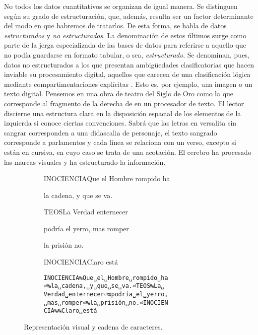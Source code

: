 No todos los datos cuantitativos se organizan de igual manera. Se distinguen según su grado de estructuración, que, además, resulta ser un factor determinante del modo en que habremos de tratarlos. De esta forma, se habla de datos \textit{estructurados} y \textit{no estructurados}. La denominación de estos últimos surge como parte de la jerga especializada de las bases de datos para referirse a aquello que no podía guardarse en formato tabular, o sea, \textit{estructurado}. Se denominan, pues, datos no estructurados a los que presentan ambigüedades clasificatorias que hacen inviable su procesamiento digital, aquellos que carecen de una clasificación lógica mediante compartimentaciones explícitas \parencite[15]{brackett2014}. Esto es, por ejemplo, una imagen o un texto digital. Pensemos en una obra de teatro del Siglo de Oro como la que corresponde al fragmento de la derecha de  en un procesador de texto. El lector discierne una estructura clara en la disposición espacial de los elementos de la izquierda si conoce ciertas convenciones. Sabrá que las letras en versalita sin sangrar corresponden a una didascalia de personaje, el texto sangrado  corresponde a parlamentos y cada línea se relaciona con un verso, excepto si están en cursiva, en cuyo caso se trata de una acotación. El cerebro ha procesado las marcas visuales y ha estructurado la información.

\begin{figure}[!ht]
	\centering
	\footnotesize
	\begin{subfigure}{.45\textwidth}
		\textsc{INOCIENCIA}\tabto{7.5em}Que el Hombre rompido ha
		
		\tabto{7.5em}la cadena, y que se va.
		
		\textsc{TEOS}\tabto{7.5em}La Verdad enternecer
		
		\tabto{7.5em}podría el yerro, mas romper
		
		\tabto{7.5em}la prisión no.
		
		\textsc{INOCIENCIA}\tabto{9em}Claro está
	\end{subfigure}%
	\begin{subfigure}{.40\textwidth}
		\texttt{INOCIENCIA{\DVS↹}Que␣el␣Hombre␣rompido␣ha {\DVS⏎↹}la␣cadena,␣y␣que␣se␣va.{\DVS⏎}TEOS{\DVS↹}La␣ Verdad␣enternecer{\DVS⏎↹}podría␣el␣yerro, ␣mas␣romper{\DVS⏎↹}la␣prisión␣no.{\DVS⏎}INOCIEN CIA{\DVS↹↹}Claro␣está}
	\end{subfigure}
	\caption{Representación visual y cadena de caracteres.}
	\label{fig:test}
	\normalsize
\end{figure}

